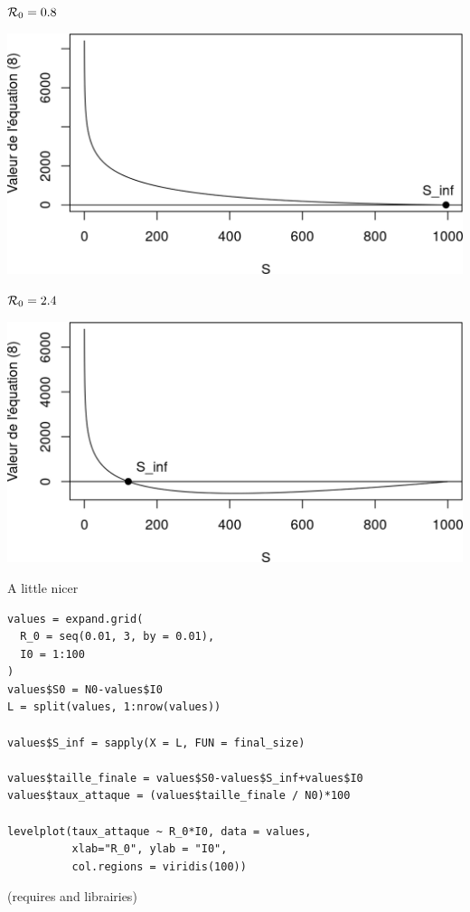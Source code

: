 \documentclass[aspectratio=43]{beamer}
\begin{document}
\begin{frame}{$\mathcal{R}_0=0.8$}
\begin{center}
  \includegraphics[width=\textwidth]{../FIGS/KMK_final_size_R0_0p8}
\end{center}
\end{frame}


\begin{frame}{$\mathcal{R}_0=2.4$}
  \begin{center}
    \includegraphics[width=\textwidth]{../FIGS/KMK_final_size_R0_2p4}
  \end{center}
\end{frame}


\begin{frame}[fragile]{A little nicer}
\begin{lstlisting}
values = expand.grid(
  R_0 = seq(0.01, 3, by = 0.01),
  I0 = 1:100
)
values$S0 = N0-values$I0
L = split(values, 1:nrow(values))

values$S_inf = sapply(X = L, FUN = final_size)

values$taille_finale = values$S0-values$S_inf+values$I0
values$taux_attaque = (values$taille_finale / N0)*100

levelplot(taux_attaque ~ R_0*I0, data = values, 
          xlab="R_0", ylab = "I0",
          col.regions = viridis(100))  
\end{lstlisting}
(requires  and  librairies)
\end{frame}
\end{document}
